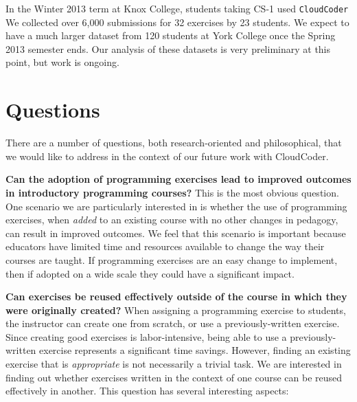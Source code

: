 \documentclass{sig-alternate}
\begin{document}
In the Winter 2013 term at Knox College, students taking CS-1 used {\tt CloudCoder}
%
% 
We collected over 6,000 submissions
for 32 exercises by 23 students.  We expect to have a much larger
dataset from 120 students at 
York College 
once the Spring 2013 semester ends.  Our analysis of these datasets is
very preliminary at this point, but work is ongoing.


\section{Questions}

%

There are a number of questions, both research-oriented and philosophical,
that we would like to address in the context of our future work with CloudCoder.

{\bf Can the adoption of programming exercises lead to improved outcomes
in introductory programming courses?}  This is the most obvious
question.  One scenario we are particularly interested in is whether
the use of programming exercises, when {\em added} to an existing course with
no other changes in pedagogy, can result in improved outcomes.  We feel
that this scenario is important because educators have limited time
and resources available to change the way their courses are taught.
If programming exercises are an easy change to implement, then
if adopted on a wide scale they could have a significant impact.

{\bf Can exercises be reused effectively outside of the course in which
they were originally created?}  When assigning a programming exercise to
students, the instructor can create one from scratch, or use a
previously-written exercise.  Since creating good exercises is labor-intensive,
being able to use a previously-written exercise represents a significant
time savings.  However, finding an existing exercise that is {\em appropriate}
is not necessarily a trivial task.  We are interested in finding
out whether exercises written in the context of one course can be reused
effectively in another.
This question has several interesting aspects:
\end{document}
